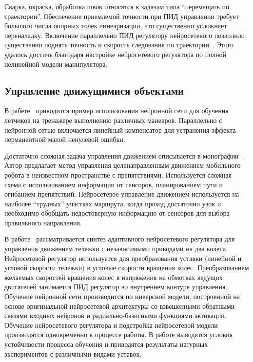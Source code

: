 Сварка, окраска, обработка швов относятся к задачам типа ``перемещать
по траектории''.  Обеспечение приемлемой точности при ПИД управлении
требует большого числа опорных точек линеаризации, что существенно
усложняет переналадку.  Включение параллельно ПИД регулятору
нейросетевого позволило существенно поднять точность и скорость
следования по траектории~\cite{chenmills97}.  Этого удалось достичь
благодаря настройке нейросетевого регулятора по полной нелинейной
модели манипулятора.

\subsection{Управление движущимися объектами}


В рабете~\cite{steck96} приводится пример использования нейронной сети
для обучения летчиков на тренажере выполнению различных маневров.
Параллельно с нейронной сетью включается линейный компенсатор для
устранения эффекта перманентной малой ненулевой ошибки.


Достаточно сложная задача управления движением описывается в
монографии~\cite{golovko01}.  Автор предлагает метод управления
целенаправленным движением мобильного робота в неизвестном
пространстве с препятствиями.  Используется сложная схема с
использованием информации от сенсоров, планированием пути и огибанием
препятствий.  Нейросетевое управление движением используется на
наиболее ``трудных'' участках маршрута, когда проход достаточно узок и
необходимо обобщать недостоверную информацию от сенсоров для выбора
правильного направления.

В работе~\cite{boquete99} рассматривается синтез адаптивного
нейросетевого регулятора для управления движением тележки с
независимыми приводами на два колеса.  Нейросетевой регулятор
используется для преобразования уставки (линейной и угловой скорости
тележки) в угловые скорости вращения колес.  Преобразованием желаемых
скоростей вращения колес в напряжения на обмотках ведущих двигателей
занимается ПИД регулятор во внутреннем контуре управления.  Обучение
нейронной сети производится по инверсной модели, построенной на основе
оригинальной нейросетевой архитектуры со взвешенными обратными связями
входных нейронов и радиально-базисными функциями активации.  Обучение
нейросетевого регулятора и подстройка нейросетевой модели производятся
одновременно в процессе работы.  В работе выводятся условия
устойчивости процесса обучения и приводятся результаты натурных
экспериментов с различными видами уставок.

